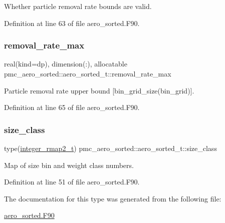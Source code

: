 Whether particle removal rate bounds are valid. 



Definition at line 63 of file aero\+\_\+sorted.\+F90.

\mbox{\label{structpmc__aero__sorted_1_1aero__sorted__t_aace29ce6a2e834ba7a7d1730f00e96d7}} 
\subsubsection{\texorpdfstring{removal\+\_\+rate\+\_\+max}{removal\_rate\_max}}
{\footnotesize\ttfamily real(kind=dp), dimension(\+:), allocatable pmc\+\_\+aero\+\_\+sorted\+::aero\+\_\+sorted\+\_\+t\+::removal\+\_\+rate\+\_\+max}



Particle removal rate upper bound \mbox{[}{\ttfamily bin\+\_\+grid\+\_\+size(bin\+\_\+grid)}\mbox{]}. 



Definition at line 65 of file aero\+\_\+sorted.\+F90.

\mbox{\label{structpmc__aero__sorted_1_1aero__sorted__t_af5e884a86b1e2bf41ea5a0c148e7e4dc}} 
\subsubsection{\texorpdfstring{size\+\_\+class}{size\_class}}
{\footnotesize\ttfamily type(\mbox{\hyperlink{structpmc__integer__rmap2_1_1integer__rmap2__t}{integer\+\_\+rmap2\+\_\+t}}) pmc\+\_\+aero\+\_\+sorted\+::aero\+\_\+sorted\+\_\+t\+::size\+\_\+class}



Map of size bin and weight class numbers. 



Definition at line 51 of file aero\+\_\+sorted.\+F90.



The documentation for this type was generated from the following file\+:\begin{DoxyCompactItemize}
\item 
\mbox{\hyperlink{aero__sorted_8_f90}{aero\+\_\+sorted.\+F90}}\end{DoxyCompactItemize}

